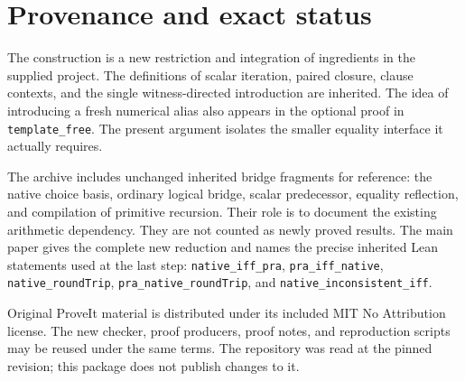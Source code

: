 \section{Provenance and exact status}

The construction is a new restriction and integration of ingredients in
the supplied project. The definitions of scalar iteration, paired
closure, clause contexts, and the single witness-directed introduction
are inherited. The idea of introducing a fresh numerical alias also
appears in the optional proof in \texttt{template\_free}. The present
argument isolates the smaller equality interface it actually requires.

The archive includes unchanged inherited bridge fragments for reference:
the native choice basis, ordinary logical bridge, scalar predecessor,
equality reflection, and compilation of primitive recursion. Their role
is to document the existing arithmetic dependency. They are not counted
as newly proved results. The main paper gives the complete new reduction
and names the precise inherited Lean statements used at the last step:
\texttt{native\_iff\_pra}, \texttt{pra\_iff\_native},
\texttt{native\_roundTrip}, \texttt{pra\_native\_roundTrip}, and
\texttt{native\_inconsistent\_iff}.

Original ProveIt material is distributed under its included MIT No
Attribution license. The new checker, proof producers, proof notes, and
reproduction scripts may be reused under the same terms. The repository
was read at the pinned revision; this package does not publish changes
to it.

